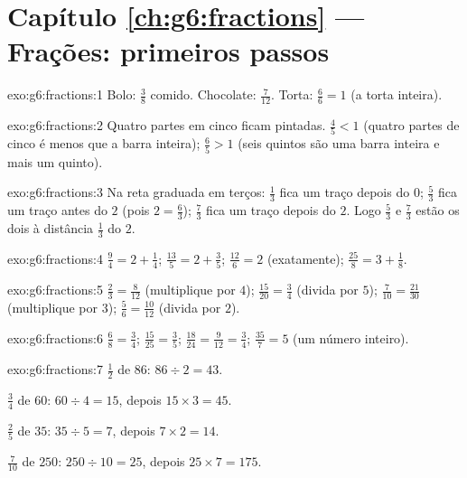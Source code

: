\section*{Capítulo \ref{ch:g6:fractions} --- Frações: primeiros passos}

\begin{solution}{exo:g6:fractions:1}
Bolo: $\frac38$ comido. \quad Chocolate: $\frac{7}{12}$. \quad
Torta: $\frac66 = 1$ (a torta inteira).
\end{solution}

\begin{solution}{exo:g6:fractions:2}
Quatro partes em cinco ficam pintadas. $\frac45 < 1$ (quatro partes de
cinco é menos que a barra inteira); $\frac65 > 1$ (seis quintos são uma
barra inteira e mais um quinto).
\end{solution}

\begin{solution}{exo:g6:fractions:3}
Na reta graduada em terços: $\frac13$ fica um traço depois do $0$;
$\frac53$ fica um traço antes do $2$ (pois $2 = \frac63$); $\frac73$
fica um traço depois do $2$. Logo $\frac53$ e $\frac73$ estão os dois à
distância $\frac13$ do $2$.
\end{solution}

\begin{solution}{exo:g6:fractions:4}
$\frac94 = 2 + \frac14$; \quad
$\frac{13}{5} = 2 + \frac35$; \quad
$\frac{12}{6} = 2$ (exatamente); \quad
$\frac{25}{8} = 3 + \frac18$.
\end{solution}

\begin{solution}{exo:g6:fractions:5}
$\frac23 = \frac{8}{12}$ (multiplique por $4$); \quad
$\frac{15}{20} = \frac34$ (divida por $5$); \quad
$\frac{7}{10} = \frac{21}{30}$ (multiplique por $3$); \quad
$\frac56 = \frac{10}{12}$ (divida por $2$).
\end{solution}

\begin{solution}{exo:g6:fractions:6}
$\frac68 = \frac34$; \quad
$\frac{15}{25} = \frac35$; \quad
$\frac{18}{24} = \frac{9}{12} = \frac34$; \quad
$\frac{35}{7} = 5$ (um número inteiro).
\end{solution}

\begin{solution}{exo:g6:fractions:7}
$\frac12$ de $86$: $86 \div 2 = 43$.

$\frac34$ de $60$: $60 \div 4 = 15$, depois $15 \times 3 = 45$.

$\frac25$ de $35$: $35 \div 5 = 7$, depois $7 \times 2 = 14$.

$\frac{7}{10}$ de $250$: $250 \div 10 = 25$, depois
$25 \times 7 = 175$.
\end{solution}

